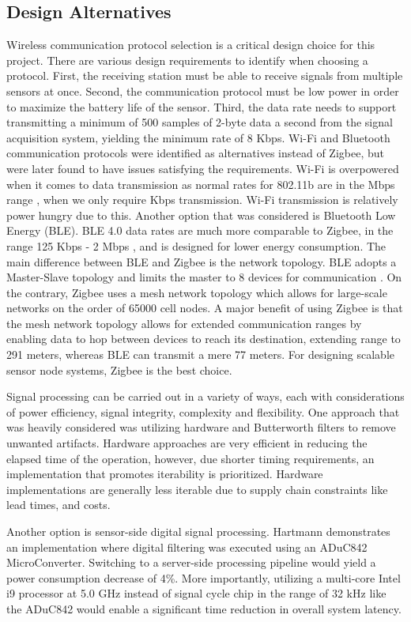 \documentclass{article}
\begin{document}
\subsection{Design Alternatives}
Wireless communication protocol selection is a critical design choice for this project. There are various design requirements to identify when choosing a protocol. First, the receiving station must be able to receive signals from multiple sensors at once. Second, the communication protocol must be low power in order to maximize the battery life of the sensor. Third, the data rate needs to support transmitting a minimum of 500 samples of 2-byte data a second from the signal acquisition system, yielding the minimum rate of 8 Kbps. Wi-Fi and Bluetooth communication protocols were identified as alternatives instead of Zigbee, but were later found to have issues satisfying the requirements. Wi-Fi is overpowered when it comes to data transmission as normal rates for 802.11b are in the Mbps range \cite{cisco}, when we only require Kbps transmission. Wi-Fi transmission is relatively power hungry due to this. Another option that was considered is Bluetooth Low Energy (BLE). BLE 4.0 data rates are much more comparable to Zigbee, in the range 125 Kbps - 2 Mbps \cite{nordic}, and is designed for lower energy consumption. The main difference between BLE and Zigbee is the network topology. BLE adopts a Master-Slave topology and limits the master to 8 devices for communication \cite{ehub}. On the contrary, Zigbee uses a mesh network topology which allows for large-scale networks on the order of 65000 cell nodes. A major benefit of using Zigbee is that the mesh network topology allows for extended communication ranges by enabling data to hop between devices to reach its destination, extending range to 291 meters, whereas BLE can transmit a mere 77 meters. For designing scalable sensor node systems, Zigbee is the best choice. 

Signal processing can be carried out in a variety of ways, each with considerations of power efficiency, signal integrity, complexity and flexibility. One approach that was heavily considered was utilizing hardware and Butterworth filters to remove unwanted artifacts. Hardware approaches are very efficient in reducing the elapsed time of the operation, however, due shorter timing requirements, an implementation that promotes iterability is prioritized. Hardware implementations are generally less iterable due to supply chain constraints like lead times, and costs.

Another option is sensor-side digital signal processing. Hartmann\cite{analog_filter} demonstrates an implementation where digital filtering was executed using an ADuC842 MicroConverter. Switching to a server-side processing pipeline would yield a power consumption decrease of 4\%. More importantly, utilizing a multi-core Intel i9 processor at 5.0 GHz \cite{msi} instead of signal cycle chip in the range of 32 kHz like the ADuC842 \cite{ADUC842} would enable a significant time reduction in overall system latency.
\end{document}
